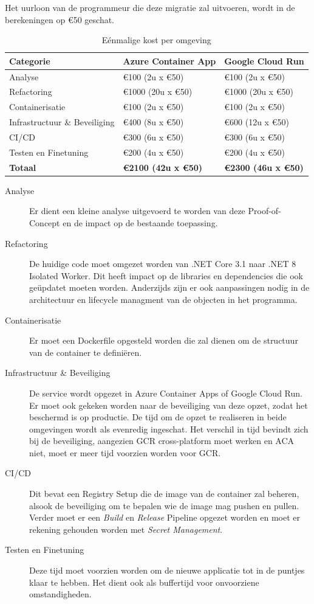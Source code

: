 Het uurloon van de programmeur die deze migratie zal uitvoeren, wordt in de berekeningen op €50 geschat.

\begin{table}[H]
    \centering
    \caption{Eénmalige kost per omgeving}
    \label{tab:vaste-kost}
    \begin{tabular}{|l|l|l|}
        \hline
        \textbf{Categorie} & \textbf{Azure Container App} & \textbf{Google Cloud Run} \\ \hline
        Analyse & €100 (2u x €50) & €100 (2u x €50) \\ \hline
        Refactoring & €1000 (20u x €50) & €1000 (20u x €50) \\ \hline
        Containerisatie & €100 (2u x €50) & €100 (2u x €50) \\ \hline
        Infrastructuur \& Beveiliging & €400 (8u x €50) & €600 (12u x €50) \\ \hline
        CI/CD & €300 (6u x €50) & €300 (6u x €50) \\ \hline
        Testen en Finetuning & €200 (4u x €50) & €200 (4u x €50) \\ \hline \hline
        \textbf{Totaal} & \textbf{€2100 (42u x €50)} & \textbf{€2300 (46u x €50)} \\ \hline
    \end{tabular}
\end{table}

\begin{description}
    \item[Analyse] 
    Er dient een kleine analyse uitgevoerd te worden van deze Proof-of-Concept en de impact op de bestaande toepassing. 
    \item [Refactoring] 
    De huidige code moet omgezet worden van .NET Core 3.1 naar .NET 8 Isolated Worker. Dit heeft impact op de libraries en dependencies die ook geüpdatet moeten worden. Anderzijds zijn er ook aanpassingen nodig in de architectuur en lifecycle managment van de objecten in het programma.
    \item[Containerisatie] 
    Er moet een Dockerfile opgesteld worden die zal dienen om de structuur van de container te definiëren.
    \item[Infrastructuur \& Beveiliging]
    De service wordt opgezet in Azure Container Apps of Google Cloud Run. Er moet ook gekeken worden naar de beveiliging van deze opzet, zodat het beschermd is op productie. De tijd om de opzet te realiseren in beide omgevingen wordt als  evenredig ingeschat. Het verschil in tijd bevindt zich bij de beveiliging, aangezien GCR cross-platform moet werken en ACA niet, moet er meer tijd voorzien worden voor GCR.
    \item[CI/CD]
    Dit bevat een Registry Setup die de image van de container zal beheren, alsook de beveiliging om te bepalen wie de image mag pushen en pullen. Verder moet er een \textit{Build} en \textit{Release} Pipeline opgezet worden en moet er rekening gehouden worden met \textit{Secret Management}.
    \item[Testen en Finetuning] 
    Deze tijd moet voorzien worden om de nieuwe applicatie tot in de puntjes klaar te hebben. Het dient ook als buffertijd voor onvoorziene omstandigheden.
\end{description}

